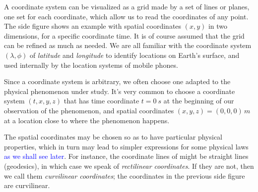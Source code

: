 \documentclass[a4paper,12pt,%
onecolumn,oneside,%
british%
]{memoir}
\renewcommand*{\|}[1][]{\nonscript\:#1\vert\nonscript\:\mathopen{}}
\newcommand*{\sect}{\S}%
\renewcommand*{\autoref}[2]{\sidepar{\vspace{-1ex}\footnotesize{\color{blue}\faIcon{%
angle-right%
}\enskip\sect~\ref{#1} page~\pageref{#1}}}\textcolor{blue}{#2}}
\begin{document}
%
%
A coordinate system can be visualized as a grid made by a set of lines or planes, one set for each coordinate, which allow us to read the coordinates of any point. The side figure shows an example with spatial coordinates $(x,y)$ in two dimensions, for a specific coordinate time. It is of course assumed that the grid can be refined as much as needed. We are all familiar with the coordinate system $(\lambda, \phi)$ of \emph{latitude} and \emph{longitude} to identify locations on Earth's surface, and used internally by the location systems of mobile phones.

Since a coordinate system is arbitrary, we often choose one adapted to the physical phenomenon under study. It's very common to choose a coordinate system $(t,x,y,z)$ that has time coordinate $t=\qty{0}{s}$ at the beginning of our observation of the phenomenon, and spatial coordinates $(x,y,z)=(0,0,0)\,\unit{m}$ at a location close to where the phenomenon happens.

\medskip

The spatial coordinates may be chosen so as to have particular physical properties, which in turn may lead to simpler expressions for some physical laws \autoref{sec:constitutive}{as we shall see later}. For instance, the coordinate lines of might be straight lines (geodesics), in which case we speak of \emph{rectilinear coordinates}. If they are not, then we call them \emph{curvilinear coordinates}; the coordinates in the previous side figure are curvilinear.
\end{document}
